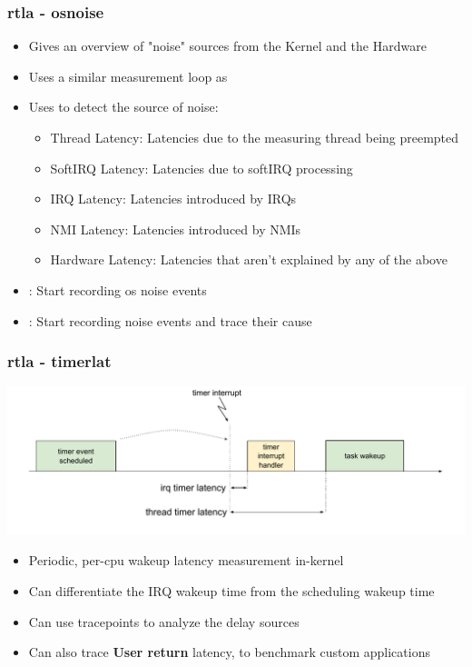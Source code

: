 \begin{frame}
	\frametitle{rtla - osnoise}
	\begin{itemize}
		\item Gives an overview of "noise" sources from the Kernel and the Hardware
		\item Uses a similar measurement loop as 
		\item Uses  to detect the source of noise:
			\begin{itemize}
				\item Thread Latency: Latencies due to the measuring thread being preempted
				\item SoftIRQ Latency: Latencies due to softIRQ processing
				\item IRQ Latency: Latencies introduced by IRQs
				\item NMI Latency: Latencies introduced by NMIs
				\item Hardware Latency: Latencies that aren't explained by any of the above
			\end{itemize}
		\item {}: Start recording os noise events
		\item {}: Start recording noise events and trace their cause
	\end{itemize}
\end{frame}

\begin{frame}
	\frametitle{rtla - timerlat}
	\includegraphics[width=\textwidth]{slides/realtime-linux-benchmarking/rtla.pdf}
	\begin{itemize}
		\item Periodic, per-cpu wakeup latency measurement in-kernel
		\item Can differentiate the IRQ wakeup time from the scheduling wakeup time
		\item Can use  tracepoints to analyze the delay sources
		\item Can also trace \textbf{User return} latency, to benchmark custom applications
	\end{itemize}
\end{frame}

